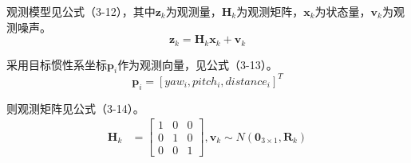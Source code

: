 观测模型见公式（3-12），其中$\boldsymbol z_k$为观测量，$\boldsymbol H_k$为观测矩阵，$\boldsymbol x_k$为状态量，$\boldsymbol v_k$为观测噪声。
\begin{equation} \boldsymbol z_{k} = \boldsymbol H_k\boldsymbol x_k + \boldsymbol {v}_{k} \end{equation}
\par
采用目标惯性系坐标$\boldsymbol p_i$作为观测向量，见公式（3-13）。
\begin{equation}\boldsymbol p_i = [yaw_i,pitch_i,distance_i]^T \end{equation} 
\par
则观测矩阵见公式（3-14）。
\begin{equation} \begin{aligned} \boldsymbol H_k &=  \left[\begin{array}{cccccc} 1 & 0 &0    \\ 0  &1 &0  \\ 0 &0  &1   \end{array}\right],\boldsymbol {v}_{k} \sim N\left(\boldsymbol 0_{3 \times 1}, \boldsymbol {R}_k\right) \end{aligned} \end{equation}
\par



